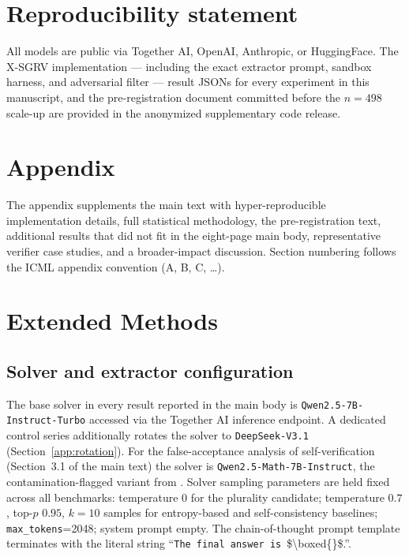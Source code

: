 \documentclass{article}
\begin{document}
\section*{Reproducibility statement}

All models are public via Together AI, OpenAI, Anthropic, or HuggingFace. The X-SGRV implementation --- including the exact extractor prompt, sandbox harness, and adversarial filter --- result JSONs for every experiment in this manuscript, and the pre-registration document committed before the $n{=}498$ scale-up are provided in the anonymized supplementary code release.




\newpage
\appendix
\onecolumn

\section*{Appendix}

The appendix supplements the main text with hyper-reproducible implementation
details, full statistical methodology, the pre-registration text, additional
results that did not fit in the eight-page main body, representative verifier
case studies, and a broader-impact discussion. Section numbering follows the
ICML appendix convention (A, B, C, \ldots).

\section{Extended Methods}
\label{app:methods}

\subsection{Solver and extractor configuration}
\label{app:models}

The base solver in every result reported in the main body is
\texttt{Qwen2.5-7B-Instruct-Turbo} accessed via the Together AI inference
endpoint. A dedicated control series additionally rotates the solver to
\texttt{DeepSeek-V3.1} (Section~\ref{app:rotation}). For the false-acceptance
analysis of self-verification (Section~3.1 of the main text) the solver is
\texttt{Qwen2.5-Math-7B-Instruct}, the contamination-flagged variant from
\citet{wu2025contam}. Solver sampling parameters are held fixed across all
benchmarks: temperature $0$ for the plurality candidate; temperature $0.7$,
top-$p$ $0.95$, $k{=}10$ samples for entropy-based and self-consistency
baselines; \texttt{max\_tokens}{=}2048; system prompt empty. The
chain-of-thought prompt template terminates with the literal string
``\texttt{The final answer is}~\$\textbackslash boxed\{\}\$.''.
\end{document}
